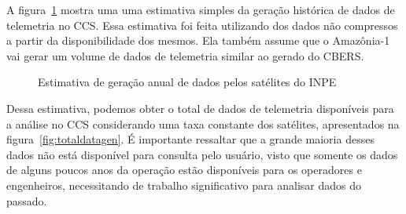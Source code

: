 {\color{cerulean}

A figura~\ref{fig:datagenest} mostra uma uma estimativa simples da geração histórica de dados de telemetria no CCS.
Essa estimativa foi feita utilizando dos dados não compressos a partir da disponibilidade dos mesmos.
Ela também assume que o Amazônia-1 vai gerar um volume de dados de telemetria similar ao gerado do CBERS.

\begin{figure}[!htb]
	\caption{Estimativa de geração anual de dados pelos satélites do INPE}\label{fig:datagenest}
	\vspace{4mm}
	\begin{center}
	\end{center}
	\vspace{2mm}
\end{figure}

Dessa estimativa, podemos obter o total de dados de telemetria disponíveis para a análise no CCS considerando uma taxa constante dos satélites, apresentados na figura~\ref{fig:totaldatagen}.
É importante ressaltar que a grande maioria desses dados não está disponível para consulta pelo usuário, visto que somente os dados de alguns poucos anos da operação estão disponíveis para os operadores e engenheiros, necessitando de trabalho significativo para analisar dados do passado.

}

